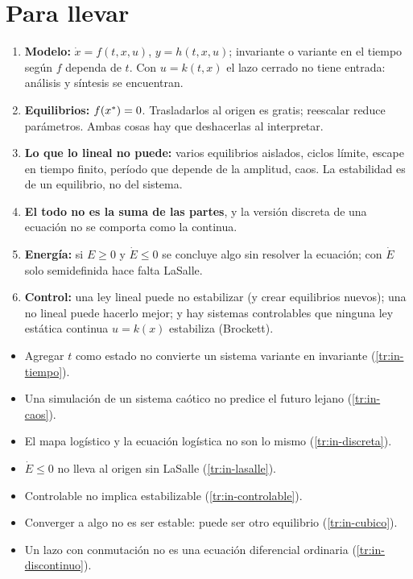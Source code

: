 \section{Para llevar}
\label{sec:in-cierre}

\begin{parallevar}
\begin{enumerate}
  \item \textbf{Modelo:} $\dot x=f(t,x,u)$, $y=h(t,x,u)$; invariante o variante en el tiempo según $f$ dependa de $t$. Con $u=k(t,x)$ el lazo cerrado no tiene entrada: análisis y síntesis se encuentran.
  \item \textbf{Equilibrios:} $f(x^{*})=0$. Trasladarlos al origen es gratis; reescalar reduce parámetros. Ambas cosas hay que deshacerlas al interpretar.
  \item \textbf{Lo que lo lineal no puede:} varios equilibrios aislados, ciclos límite, escape en tiempo finito, período que depende de la amplitud, caos. La estabilidad es de un equilibrio, no del sistema.
  \item \textbf{El todo no es la suma de las partes}, y la versión discreta de una ecuación no se comporta como la continua.
  \item \textbf{Energía:} si $E\ge0$ y $\dot E\le0$ se concluye algo sin resolver la ecuación; con $\dot E$ solo semidefinida hace falta LaSalle.
  \item \textbf{Control:} una ley lineal puede no estabilizar (y crear equilibrios nuevos); una no lineal puede hacerlo mejor; y hay sistemas controlables que ninguna ley estática continua $u=k(x)$ estabiliza (Brockett).
\end{enumerate}
\end{parallevar}

\begin{trampa}[title={\faBug\hspace{0.45em}Las trampas del capítulo, en una caja}]{}
\begin{itemize}
  \item Agregar $t$ como estado no convierte un sistema variante en invariante (\cref{tr:in-tiempo}).
  \item Una simulación de un sistema caótico no predice el futuro lejano (\cref{tr:in-caos}).
  \item El mapa logístico y la ecuación logística no son lo mismo (\cref{tr:in-discreta}).
  \item $\dot E\le0$ no lleva al origen sin LaSalle (\cref{tr:in-lasalle}).
  \item Controlable no implica estabilizable (\cref{tr:in-controlable}).
  \item Converger a algo no es ser estable: puede ser otro equilibrio (\cref{tr:in-cubico}).
  \item Un lazo con conmutación no es una ecuación diferencial ordinaria (\cref{tr:in-discontinuo}).
\end{itemize}
\end{trampa}


